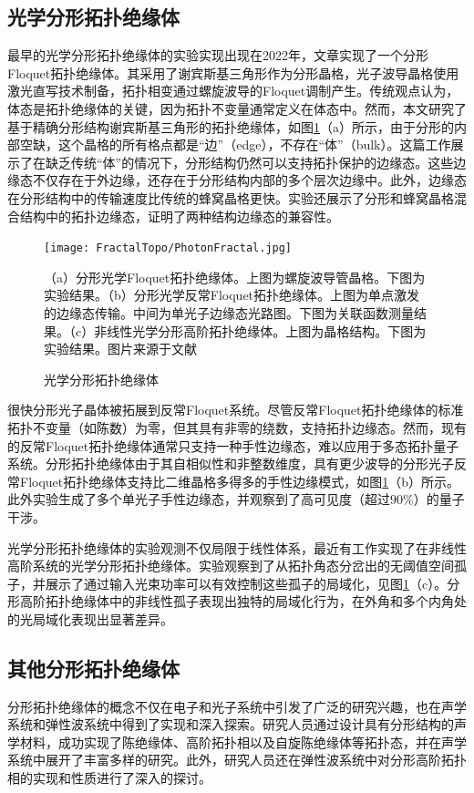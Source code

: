 \subsection{光学分形拓扑绝缘体}
最早的光学分形拓扑绝缘体的实验实现出现在2022年\cite{biesenthal2022fractal}，文章实现了一个分形Floquet拓扑绝缘体。其采用了谢宾斯基三角形作为分形晶格，光子波导晶格使用激光直写技术制备，拓扑相变通过螺旋波导的Floquet调制产生。传统观点认为，体态是拓扑绝缘体的关键，因为拓扑不变量通常定义在体态中。然而，本文研究了基于精确分形结构谢宾斯基三角形的拓扑绝缘体，如图\ref{fig:PhotonFractal}（a）所示，由于分形的内部空缺，这个晶格的所有格点都是“边”（edge），不存在“体”（bulk）。这篇工作展示了在缺乏传统“体”的情况下，分形结构仍然可以支持拓扑保护的边缘态。这些边缘态不仅存在于外边缘，还存在于分形结构内部的多个层次边缘中。此外，边缘态在分形结构中的传输速度比传统的蜂窝晶格更快。实验还展示了分形和蜂窝晶格混合结构中的拓扑边缘态，证明了两种结构边缘态的兼容性。
\begin{figure}[htbp]
    \centering
    \texttt{[image: FractalTopo/PhotonFractal.jpg]}
    \caption{光学分形拓扑绝缘体}（a）分形光学Floquet拓扑绝缘体。上图为螺旋波导管晶格。下图为实验结果。（b）分形光学反常Floquet拓扑绝缘体。上图为单点激发的边缘态传输。中间为单光子边缘态光路图。下图为关联函数测量结果。（c）非线性光学分形高阶拓扑绝缘体。上图为晶格结构。下图为实验结果。图片来源于文献\cite{biesenthal2022fractal,li2023fractal,zhong2024observation}
    \label{fig:PhotonFractal}
\end{figure}
很快分形光子晶体被拓展到反常Floquet系统\cite{li2023fractal}。尽管反常Floquet拓扑绝缘体的标准拓扑不变量（如陈数）为零，但其具有非零的绕数，支持拓扑边缘态。然而，现有的反常Floquet拓扑绝缘体通常只支持一种手性边缘态，难以应用于多态拓扑量子系统。分形拓扑绝缘体由于其自相似性和非整数维度，具有更少波导的分形光子反常Floquet拓扑绝缘体支持比二维晶格多得多的手性边缘模式，如图\ref{fig:PhotonFractal}（b）所示。此外实验生成了多个单光子手性边缘态，并观察到了高可见度（超过$90\%$）的量子干涉。

光学分形拓扑绝缘体的实验观测不仅局限于线性体系，最近有工作实现了在非线性高阶系统的光学分形拓扑绝缘体\cite{zhong2024observation}。实验观察到了从拓扑角态分岔出的无阈值空间孤子，并展示了通过输入光束功率可以有效控制这些孤子的局域化，见图\ref{fig:PhotonFractal}（c）。分形高阶拓扑绝缘体中的非线性孤子表现出独特的局域化行为，在外角和多个内角处的光局域化表现出显著差异。

\subsection{其他分形拓扑绝缘体}
分形拓扑绝缘体的概念不仅在电子和光子系统中引发了广泛的研究兴趣，也在声学系统和弹性波系统中得到了实现和深入探索。研究人员通过设计具有分形结构的声学材料，成功实现了陈绝缘体\cite{li2023fractality}、高阶拓扑相\cite{LI20222040}以及自旋陈绝缘体\cite{lai2024spin}等拓扑态，并在声学系统中展开了丰富多样的研究。此外，研究人员还在弹性波系统中对分形高阶拓扑相的实现和性质进行了深入的探讨\cite{ma2023elastic,dorin2024uncovering}。

